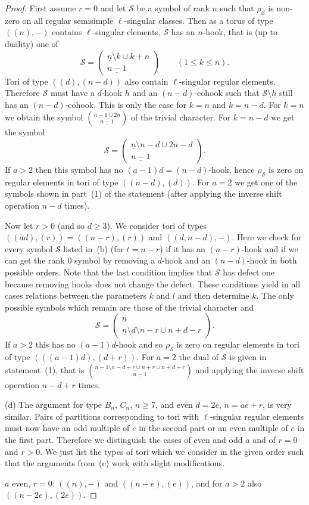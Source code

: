 \documentclass{ert-l}
\newcommand{\cS}{{\mathcal{S}}}
\newcommand{\ul}[1]{\underline{#1}}
\newcommand{\sy}[2]{\ensuremath{\left(\begin{array}{c}{#1}\\{#2}\end{array}\right)}}
\let\sm=\setminus
\let\sys=\binom
\theoremstyle{definition}
\theoremstyle{remark}
\begin{document}
\begin{proof}
First assume $r=0$ and let $\cS$ be a symbol of rank $n$ such that $\rho_\cS$
is non-zero on all regular semisimple $\ell$-singular classes. Then as a
torus of type  $((n),-)$ contains $\ell$-singular elements, $\cS$ has
an $n$-hook, that is (up to duality) one of
\[ \cS = \sy{\ul{n}\sm k \cup k+n}{\ul{n-1}} \qquad (1\leq k\leq n).\]
Tori of type $((d),(n-d))$ also contain $\ell$-singular regular elements.
Therefore $\cS$ must have a $d$-hook $h$ and an $(n-d)$-cohook such that
$\cS\setminus h$ still has an $(n-d)$-cohook. This is only the case
for $k=n$ and $k=n-d$. For $k=n$ we obtain the symbol $\sys{\ul{n-1}\cup
2n}{\ul{n-1}}$ of the trivial character.  For $k = n-d$ we get the symbol
\[ \cS = \sy{\ul{n}\sm n-d \cup 2n-d}{\ul{n-1}}.\]
If $a>2$ then this symbol has no $(a-1)d = (n-d)$-hook, hence $\rho_\cS$ is
zero on regular elements in tori of type $((n-d),(d))$. For $a=2$ we get one
of the symbols shown in part~(1) of the statement (after applying the
inverse shift operation $n-d$ times).

Now let $r>0$ (and so $d\geq 3$). We consider tori of types
$((ad),(r)) = ((n-r),(r))$ and $((d,n-d),-)$. Here we check for every symbol
$\cS$ listed in~(b) (for $t=n-r$) if it has an $(n-r)$-hook and if
we can get the rank $0$ symbol by removing a $d$-hook and an $(n-d)$-hook
in both possible orders.
Note that the last condition implies that $\cS$ has defect one because
removing hooks does not change the defect. These conditions yield in all
cases relations between the parameters $k$ and $l$ and then determine $k$. The
only possible symbols which remain are those of the trivial character and
\[ \cS = \sy{\ul{n}}{\ul{n}\sm d \sm n-r \cup n+d-r}.\]
If $a>2$ this has no $(a-1)d$-hook and so $\rho_\cS$ is zero on regular
elements in tori of type $(((a-1)d),(d+r))$. For $a=2$ the dual of $\cS$ is
given in statement~(1), that is $\sys{\ul{n-1}\sm n-d+r\cup n+r\cup
n+d+r}{\ul{n-1}}$ and applying the inverse shift operation $n-d+r$ times.

(d) The argument for type $B_n$, $C_n$, $n \geq 7$, and even $d=2e$,
$n=ae+r$, is very
similar. Pairs of partitions corresponding to tori with $\ell$-singular regular
elements must now have an odd multiple of $e$ in the second part or an even
multiple of $e$ in the first part. Therefore we distinguish the cases
of even and odd $a$ and of $r=0$ and $r>0$. We just list the types of tori
which we consider in the given order such that the arguments from~(c) work
with slight modifications.

$a$ even, $r=0$: $((n),-)$ and $((n-e),(e))$, and for $a>2$ also
$((n-2e),(2e))$.


\end{proof}
\end{document}
